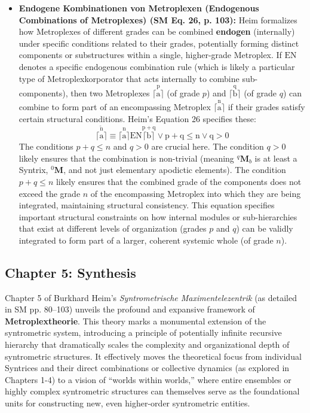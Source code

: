 \documentclass[12pt]{article}
\newcommand{\q}[1]{\enquote{#1}}
\newcommand{\metroplex}[1]{{}^{#1}\mathbf{M}}
\begin{document}
\begin{itemize}
    \item \textbf{Endogene Kombinationen von Metroplexen (Endogenous Combinations of Metroplexes) (SM Eq. 26, p. 103):}
    Heim formalizes how Metroplexes of different grades can be combined \textbf{endogen} (internally) under specific conditions related to their grades, potentially forming distinct components or substructures within a single, higher-grade Metroplex. If \( \mathrm{EN} \) denotes a specific endogenous combination rule (which is likely a particular type of Metroplexkorporator that acts internally to combine sub-components), then two Metroplexes \( \overset{\mathrm{p}}{\lceil\mathrm{a}\rceil} \) (of grade \( p \)) and \( \overset{\mathrm{q}}{\lceil\mathrm{b}\rceil} \) (of grade \( q \)) can combine to form part of an encompassing Metroplex \( \overset{\mathrm{n}}{\lceil\mathrm{a}\rceil} \) if their grades satisfy certain structural conditions. Heim's Equation 26 specifies these:
    \begin{equation}
    \overset{\tilde{\mathrm{n}}}{\lceil\mathrm{a}\rceil} \equiv \overset{\mathrm{n}}{\lceil\mathrm{a}\rceil} \mathrm{EN} \overset{\mathrm{p}+\mathrm{q}}{\lceil\mathrm{b}\rceil} \vee \mathrm{p}+\mathrm{q} \le \mathrm{n} \vee \mathrm{q} > 0 \label{eq:original_endogene_kombination} \tag{26}
    \end{equation}
    The conditions \( p+q \leq n \) and \( q > 0 \) are crucial here. The condition \( q > 0 \) likely ensures that the combination is non-trivial (meaning \( \metroplex{q}_b \) is at least a Syntrix, \( \metroplex{0} \), and not just elementary apodictic elements). The condition \( p+q \leq n \) likely ensures that the combined grade of the components does not exceed the grade \( n \) of the encompassing Metroplex into which they are being integrated, maintaining structural consistency. This equation specifies important structural constraints on how internal modules or sub-hierarchies that exist at different levels of organization (grades \( p \) and \( q \)) can be validly integrated to form part of a larger, coherent systemic whole (of grade \( n \)).
\end{itemize}
\subsection{Chapter 5: Synthesis}
\label{sec:chapter5_synthesis}

Chapter 5 of Burkhard Heim's \textit{Syntrometrische Maximentelezentrik} (as detailed in SM pp. 80–103) unveils the profound and expansive framework of \textbf{Metroplextheorie}. This theory marks a monumental extension of the syntrometric system, introducing a principle of potentially infinite recursive hierarchy that dramatically scales the complexity and organizational depth of syntrometric structures. It effectively moves the theoretical focus from individual Syntrices and their direct combinations or collective dynamics (as explored in Chapters 1-4) to a vision of \q{worlds within worlds,} where entire ensembles or highly complex syntrometric structures can themselves serve as the foundational units for constructing new, even higher-order syntrometric entities.
\end{document}
